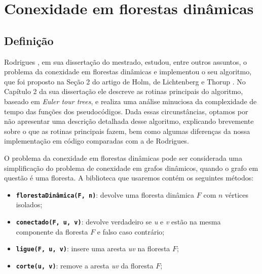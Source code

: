 
\chapter{Conexidade em florestas dinâmicas}

\section{Definição}

Rodrigues \cite{arthur}, em sua dissertação do mestrado, estudou, entre outros assuntos, o problema da conexidade em florestas dinâmicas e implementou o seu algoritmo, que foi proposto na Seção 2 do artigo de Holm, de Lichtenberg e Thorup \cite{jacob_holm}. No Capítulo 2 da sua dissertação ele descreve as rotinas principais do algoritmo, baseado em \textit{Euler tour trees}, e realiza uma análise minuciosa da complexidade de tempo das funções dos pseudocódigos. Dada essas circunstâncias, optamos por não apresentar uma descrição detalhada desse algoritmo, explicando brevemente sobre o que as rotinas principais fazem, bem como algumas diferenças da nossa implementação em código comparadas com a de Rodrigues.  

O problema da conexidade em florestas dinâmicas pode ser considerada uma simplificação do problema de conexidade em grafos dinâmicos, quando o grafo em questão é uma floresta. A biblioteca que usaremos contém os seguintes métodos:

\begin{itemize}
    \item \texttt{\textbf{florestaDinâmica(F, n)}}: devolve uma floresta dinâmica $F$ com $n$ vértices isolados;
    \item \texttt{\textbf{conectado(F, u, v)}}: devolve verdadeiro se \textit{u} e \textit{v} estão na mesma componente da floresta $F$ e falso caso contrário;
    \item \texttt{\textbf{ligue(F, u, v)}}: insere uma aresta \textit{uv} na floresta $F$;
    \item \texttt{\textbf{corte(u, v)}}: remove a aresta \textit{uv} da floresta $F$;
\end{itemize}

